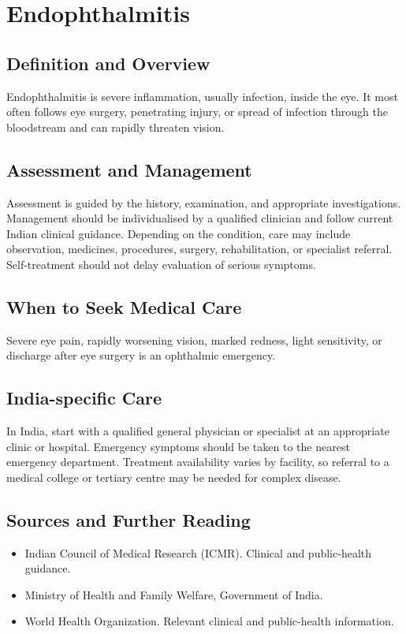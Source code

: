 \chapter{Endophthalmitis}

\section*{Definition and Overview}
Endophthalmitis is severe inflammation, usually infection, inside the eye. It most often follows eye surgery, penetrating injury, or spread of infection through the bloodstream and can rapidly threaten vision.

\section*{Assessment and Management}
Assessment is guided by the history, examination, and appropriate investigations. Management should be individualised by a qualified clinician and follow current Indian clinical guidance. Depending on the condition, care may include observation, medicines, procedures, surgery, rehabilitation, or specialist referral. Self-treatment should not delay evaluation of serious symptoms.

\section*{When to Seek Medical Care}
Severe eye pain, rapidly worsening vision, marked redness, light sensitivity, or discharge after eye surgery is an ophthalmic emergency.

\section*{India-specific Care}
In India, start with a qualified general physician or specialist at an appropriate clinic or hospital. Emergency symptoms should be taken to the nearest emergency department. Treatment availability varies by facility, so referral to a medical college or tertiary centre may be needed for complex disease.

\section*{Sources and Further Reading}
\begin{itemize}
    \item Indian Council of Medical Research (ICMR). Clinical and public-health guidance.
    \item Ministry of Health and Family Welfare, Government of India.
    \item World Health Organization. Relevant clinical and public-health information.
\end{itemize}

